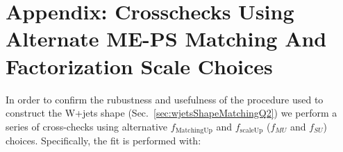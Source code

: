 \section{Appendix: Crosschecks Using Alternate ME-PS Matching And Factorization Scale Choices}
\label{sec:afmufsucrosschecks}

In order to confirm the rubustness and usefulness of the procedure used to construct the W+jets shape (Sec.~\ref{sec:wjetsShapeMatchingQ2}) we perform a series of cross-checks using alternative $f_\text{MatchingUp}$ and $f_\text{scaleUp}$ ($f_{MU}$ and $f_{SU}$) choices. Specifically, the fit is performed with:
